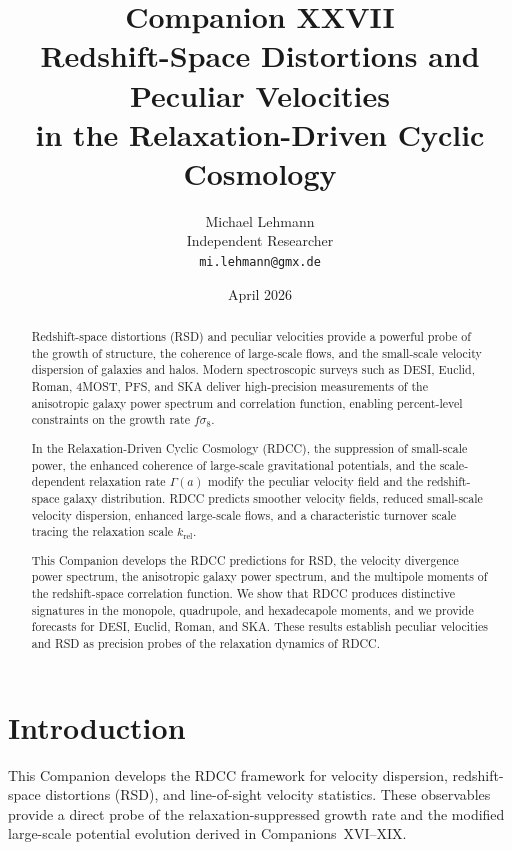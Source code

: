 \documentclass[11pt,a4paper]{article}
\title{
\textbf{Companion XXVII}\\[4mm]
\textbf{Redshift-Space Distortions and Peculiar Velocities}\\
\textbf{in the Relaxation-Driven Cyclic Cosmology}
}
\author{
Michael Lehmann\\
Independent Researcher\\
\texttt{mi.lehmann@gmx.de}
}
\date{April 2026}
\begin{document}
\maketitle

\begin{abstract}
Redshift-space distortions (RSD) and peculiar velocities provide a powerful probe of the 
growth of structure, the coherence of large-scale flows, and the small-scale velocity 
dispersion of galaxies and halos. Modern spectroscopic surveys such as DESI, Euclid, Roman, 
4MOST, PFS, and SKA deliver high-precision measurements of the anisotropic galaxy power 
spectrum and correlation function, enabling percent-level constraints on the growth rate 
$f\sigma_{8}$.

In the Relaxation-Driven Cyclic Cosmology (RDCC), the suppression of small-scale power, the 
enhanced coherence of large-scale gravitational potentials, and the scale-dependent 
relaxation rate $\Gamma(a)$ modify the peculiar velocity field and the redshift-space galaxy 
distribution. RDCC predicts smoother velocity fields, reduced small-scale velocity 
dispersion, enhanced large-scale flows, and a characteristic turnover scale tracing the 
relaxation scale $k_{\mathrm{rel}}$.

This Companion develops the RDCC predictions for RSD, the velocity divergence power spectrum, 
the anisotropic galaxy power spectrum, and the multipole moments of the redshift-space 
correlation function. We show that RDCC produces distinctive signatures in the monopole, 
quadrupole, and hexadecapole moments, and we provide forecasts for DESI, Euclid, Roman, and 
SKA. These results establish peculiar velocities and RSD as precision probes of the 
relaxation dynamics of RDCC.
\end{abstract}


\section{Introduction}

This Companion develops the RDCC framework for velocity dispersion, redshift-space
distortions (RSD), and line-of-sight velocity statistics. These observables provide a direct
probe of the relaxation-suppressed growth rate and the modified large-scale potential
evolution derived in Companions~XVI–XIX.
\end{document}
